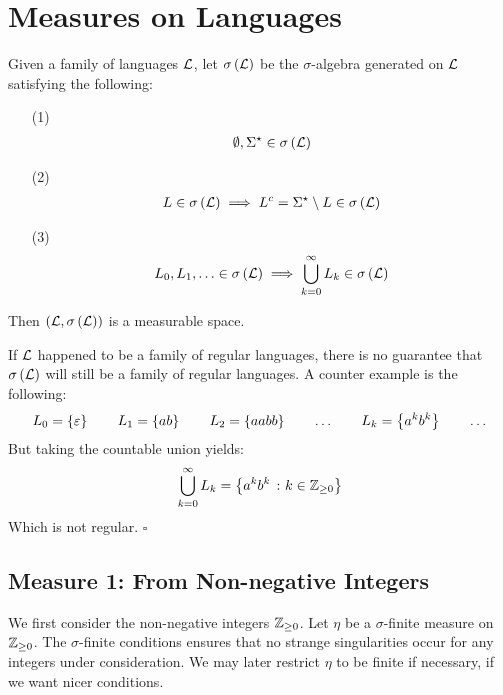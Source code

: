 \section{Measures on Languages}
Given a family of languages \(\mathcal{L}\),
let \(\sigma\left(\mathcal{L}\right)\) be the \(\sigma\)-algebra generated on
\(\mathcal{L}\) satisfying the following:

\begin{enumerate}
  \item[(1)]
    \begin{align*}
      \emptyset, \Sigma^\star \in \sigma\left(\mathcal{L}\right)
    \end{align*}

  \item[(2)]
    \begin{align*}
      L \in \sigma\left(\mathcal{L}\right)
        \implies
          L^c = \Sigma^\star \setminus L \in \sigma\left(\mathcal{L}\right)
    \end{align*}

  \item[(3)]
    \begin{align*}
      L_0, L_1, \ldots \in \sigma\left(\mathcal{L}\right)
        \implies
          \bigcup_{k = 0}^{\infty} L_k \in \sigma\left(\mathcal{L}\right)
    \end{align*}

\end{enumerate}

Then \(\left(\mathcal{L}, \sigma\left(\mathcal{L}\right)\right)\) is a measurable space.

\begin{remark}
If \(\mathcal{L}\) happened to be a family of regular languages,
there is no guarantee that \(\sigma\left(\mathcal{L}\right)\)
will still be a family of regular languages.
A counter example is the following:
\begin{align*}
  L_0 = \left\{\varepsilon\right\}
  \qquad
  L_1 = \left\{ab\right\}
  \qquad
  L_2 = \left\{aabb\right\}
  \qquad
  \ldots
  \qquad
  L_k = \left\{a^k b^k\right\}
  \qquad
  \ldots
\end{align*}
But taking the countable union yields:
\begin{align*}
  \bigcup_{k = 0}^{\infty} L_k = \left\{a^k b^k \ \colon k \in \mathbb{Z}_{\geq 0}\right\}
\end{align*}
Which is not regular.
\hfill\(\square\)
\end{remark}


\subsection{Measure 1: From Non-negative Integers}
We first consider the non-negative integers \(\mathbb{Z}_{\geq 0}\).
Let \(\eta\) be a \(\sigma\)-finite measure on \(\mathbb{Z}_{\geq 0}\).
The \(\sigma\)-finite conditions ensures that no strange singularities
occur for any integers under consideration.
We may later restrict \(\eta\) to be finite if necessary,
if we want nicer conditions.

